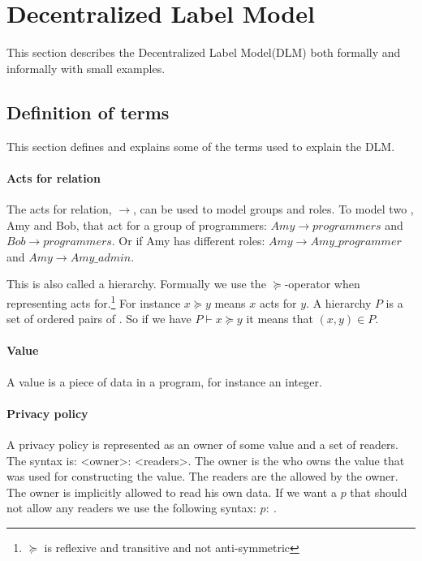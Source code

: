 \section{Decentralized Label Model}
\newcommand{\xvalue}{value}
\newcommand{\xvalues}{values}
This section describes the Decentralized Label Model(DLM) both formally and informally with small examples.

\subsection{Definition of terms}
This section defines and explains some of the terms used to explain the DLM.

\paragraph{Acts for relation}
The acts for relation, $\rightarrow$, can be used to model groups and roles.
To model two \principals{}, Amy and Bob, that act for a group of programmers: $Amy \rightarrow programmers$ and $Bob \rightarrow programmers$.
Or if Amy has different roles: $Amy \rightarrow Amy\_programmer$ and $Amy \rightarrow Amy\_admin$.

This is also called a \principal{} hierarchy.
Formually we use the $\succeq$-operator when representing acts for.\footnote{$\succeq$ is reflexive and transitive and not anti-symmetric}
For instance $x \succeq y$ means $x$ acts for $y$.
A \principal{} hierarchy $P$ is a set of ordered pairs of \principals{}.
So if we have $P \vdash x \succeq y$ it means that $(x,y) \in P$.

\paragraph{Value}
A \xvalue{} is a piece of data in a program, for instance an integer.

\paragraph{Privacy policy}
A privacy policy is represented as an owner of some \xvalue{} and a set of readers.
The syntax is: <owner>: <readers>.
The owner is the \principal{} who owns the \xvalue{} that was used for constructing the \xvalue{}.
The readers are the \principals{} allowed by the owner.
The owner is implicitly allowed to read his own data.
If we want a \principal{} $p$ that should not allow any readers we use the following syntax: $p: \ $.

